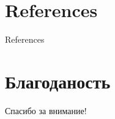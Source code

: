 \section{References}

\begin{frame}[t]{References}
	\printbibliography
	\url{}
	\url{}
\end{frame}

\section{Благоданость}
\begin{frame}
	\centering
	\huge
	Спасибо за внимание!
\end{frame}


